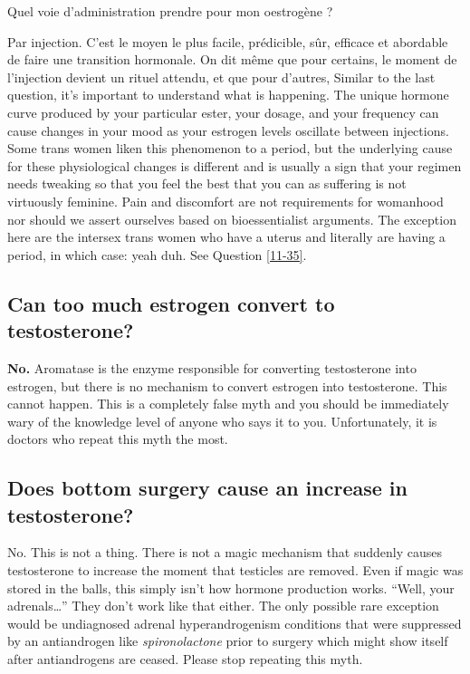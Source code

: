 \documentclass{article}
\begin{document}
Quel voie d'administration prendre pour mon oestrogène ?

Par injection. C'est le moyen le plus facile, prédicible, sûr, efficace et abordable de faire une transition hormonale. On dit même que pour certains, le moment de l'injection devient un rituel attendu, et que pour d'autres,  
Similar to the last question, it’s important to understand what is happening. The unique hormone curve produced by your particular ester, your dosage, and your frequency can cause changes in your mood as your estrogen levels oscillate between injections. Some trans women liken this phenomenon to a period, but the underlying cause for these physiological changes is different and is usually a sign that your regimen needs tweaking so that you feel the best that you can as suffering is not virtuously feminine. Pain and discomfort are not requirements for womanhood nor should we assert ourselves based on bioessentialist arguments. The exception here are the intersex trans women who have a uterus and literally are having a period, in which case: yeah duh. See Question \ref{11-35}.

\subsection{Can too much estrogen convert to testosterone?}

\textbf{No.} Aromatase is the enzyme responsible for converting testosterone into estrogen, but there is no mechanism to convert estrogen into testosterone. This cannot happen. This is a completely false myth and you should be immediately wary of the knowledge level of anyone who says it to you. Unfortunately, it is doctors who repeat this myth the most.

\subsection{Does bottom surgery cause an increase in testosterone?}

No. This is not a thing. There is not a magic mechanism that suddenly causes testosterone to increase the moment that testicles are removed. Even if magic was stored in the balls, this simply isn’t how hormone production works. “Well, your adrenals…” They don’t work like that either. The only possible rare exception would be undiagnosed adrenal hyperandrogenism conditions that were suppressed by an antiandrogen like \textit{spironolactone }prior to surgery which might show itself after antiandrogens are ceased. Please stop repeating this myth.
\end{document}
